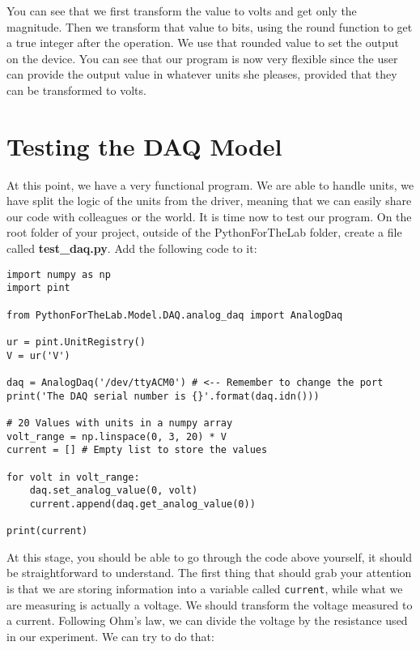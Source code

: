 You can see that we first transform the value to volts and get only the magnitude. Then we transform that value to bits, using the round function to get a true integer after the operation. We use that rounded value to set the output on the device. You can see that our program is now very flexible since the user can provide the output value in whatever units she pleases, provided that they can be transformed to volts.


\section{Testing the DAQ Model}
At this point, we have a very functional program. We are able to handle units, we have split the logic of the units from the driver, meaning that we can easily share our code with colleagues or the world. It is time now to test our program. On the root folder of your project, outside of the PythonForTheLab folder, create a file called \textbf{test\_daq.py}. Add the following code to it:

\begin{verbatim}
import numpy as np
import pint

from PythonForTheLab.Model.DAQ.analog_daq import AnalogDaq

ur = pint.UnitRegistry()
V = ur('V')

daq = AnalogDaq('/dev/ttyACM0') # <-- Remember to change the port
print('The DAQ serial number is {}'.format(daq.idn()))

# 20 Values with units in a numpy array
volt_range = np.linspace(0, 3, 20) * V 
current = [] # Empty list to store the values

for volt in volt_range:
    daq.set_analog_value(0, volt)
    current.append(daq.get_analog_value(0))

print(current)
\end{verbatim}

At this stage, you should be able to go through the code above yourself, it should be straightforward to understand. The first thing that should grab your attention is that we are storing information into a variable called \texttt{current}, while what we are measuring is actually a voltage. We should transform the voltage measured to a current. Following Ohm's law, we can divide the voltage by the resistance used in our experiment. We can try to do that:

